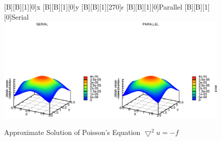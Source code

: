 \documentclass[12pt,a4paper]{report}
\begin{document}
\begin{figure}[htb]
  [B][B][1][0]{x}
  [B][B][1][0]{y}
  [B][B][1][270]{$\epsilon$}
  [B][B][1][0]{Parallel}
  [B][B][1][0]{Serial}
  \includegraphics{./images/poiss.eps}
  \caption{Approximate Solution of Poisson's Equation
    $\bigtriangledown^{2}u=-f$}
  \label{fig:approxPoiss}
\end{figure}
    
\end{document}
